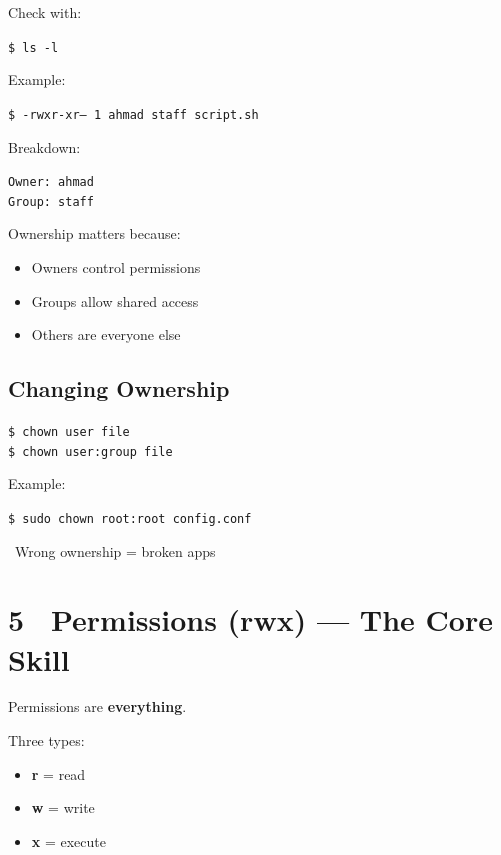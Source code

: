 \documentclass[12pt]{article}
\newcommand{\permissionicon}{\faLock}
\newcommand{\warningicon}{\faExclamationTriangle}
\begin{document}
Check with:

\begin{highlightbox}
\texttt{\$ ls -l}
\end{highlightbox}

Example:

\begin{highlightbox}
\texttt{\$ -rwxr-xr-- 1 ahmad staff script.sh}
\end{highlightbox}

Breakdown:

\begin{infobox}
\texttt{Owner: ahmad}\\
\texttt{Group: staff}
\end{infobox}

Ownership matters because:

\begin{itemize}
    \item Owners control permissions
    \item Groups allow shared access
    \item Others are everyone else
\end{itemize}

\subsection*{Changing Ownership}

\begin{highlightbox}
\texttt{\$ chown user file}\\
\texttt{\$ chown user:group file}
\end{highlightbox}

Example:

\begin{highlightbox}
\texttt{\$ sudo chown root:root config.conf}
\end{highlightbox}

\begin{warningbox}
\warningicon\ Wrong ownership = broken apps
\end{warningbox}

\section*{5 \permissionicon\ Permissions (rwx) — The Core Skill}

Permissions are \textbf{everything}.

Three types:

\begin{itemize}
    \item \textbf{r} = read
    \item \textbf{w} = write
    \item \textbf{x} = execute
\end{itemize}
\end{document}
